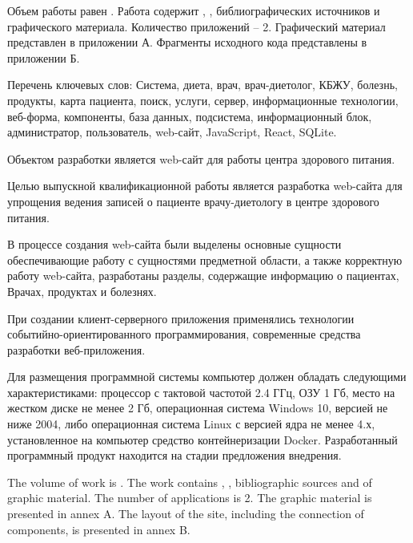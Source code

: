 
Объем работы равен . Работа содержит , ,  библиографических источников и  графического материала. Количество приложений – 2. Графический материал представлен в приложении А. Фрагменты исходного кода представлены в приложении Б.

Перечень ключевых слов: Система, диета, врач, врач-диетолог, КБЖУ, болезнь, продукты, карта пациента, поиск, услуги, сервер, информационные технологии, веб-форма, компоненты, база данных, подсистема, информационный блок, администратор, пользователь, web-сайт, JavaScript, React, SQLite.

Объектом разработки является web-сайт для работы центра здорового питания.

Целью выпускной квалификационной работы является разработка web-сайта для упрощения ведения записей о пациенте  врачу-диетологу в центре здорового питания.

В процессе создания web-сайта были выделены основные сущности обеспечивающие работу с сущностями предметной области, а также корректную работу web-сайта, разработаны разделы, содержащие информацию о пациентах, Врачах, продуктах и болезнях.

При создании клиент-серверного приложения применялись технологии событийно-ориентированного программирования, современные средства разработки веб-приложения.

Для размещения программной системы компьютер должен обладать следующими характеристиками: процессор с тактовой частотой 2.4 ГГц, ОЗУ 1 Гб, место на жестком диске не менее 2 Гб, операционная система Windows 10, версией не ниже 2004, либо операционная система Linux с версией ядра не менее 4.х, установленное на компьютер средство контейнеризации Docker. 
Разработанный программный продукт находится на стадии предложения внедрения.

  
The volume of work is . The work contains , ,  bibliographic sources and  of graphic material. The number of applications is 2. The graphic material is presented in annex A. The layout of the site, including the connection of components, is presented in annex B.

